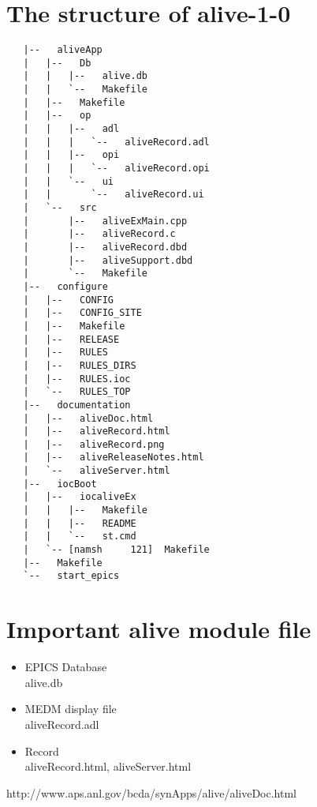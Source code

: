 \documentclass[11pt
  , a4paper
  , article
  , oneside
]{memoir}
\begin{document}
\section{The structure of alive-1-0}
  \begin{verbatim}
   |--   aliveApp
   |   |--   Db
   |   |   |--   alive.db
   |   |   `--   Makefile
   |   |--   Makefile
   |   |--   op
   |   |   |--   adl
   |   |   |   `--   aliveRecord.adl
   |   |   |--   opi
   |   |   |   `--   aliveRecord.opi
   |   |   `--   ui
   |   |       `--   aliveRecord.ui
   |   `--   src
   |       |--   aliveExMain.cpp
   |       |--   aliveRecord.c
   |       |--   aliveRecord.dbd
   |       |--   aliveSupport.dbd
   |       `--   Makefile
   |--   configure
   |   |--   CONFIG
   |   |--   CONFIG_SITE
   |   |--   Makefile
   |   |--   RELEASE
   |   |--   RULES
   |   |--   RULES_DIRS
   |   |--   RULES.ioc
   |   `--   RULES_TOP
   |--   documentation
   |   |--   aliveDoc.html
   |   |--   aliveRecord.html
   |   |--   aliveRecord.png
   |   |--   aliveReleaseNotes.html
   |   `--   aliveServer.html
   |--   iocBoot
   |   |--   iocaliveEx
   |   |   |--   Makefile
   |   |   |--   README
   |   |   `--   st.cmd
   |   `-- [namsh     121]  Makefile
   |--   Makefile
   `--   start_epics

   \end{verbatim}
   \section{Important alive module file}
   
      \begin{itemize}
      	\item EPICS Database\\
      	alive.db 
      	\item MEDM display file\\
      	aliveRecord.adl
      	\item Record\\
      	aliveRecord.html,
      	aliveServer.html
      	   \end{itemize}
      	   http://www.aps.anl.gov/bcda/synApps/alive/aliveDoc.html
      	
   \clearpage
   
\end{document}
